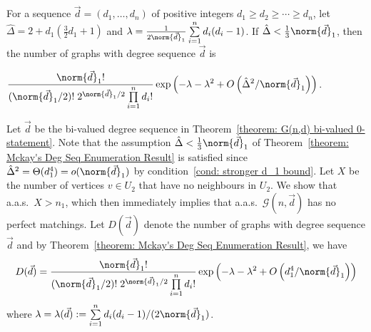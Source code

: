 \documentclass[12pt]{article}
\begin{document}
\begin{theorem}
\label{theorem: Mckay's Deg Seq Enumeration Result}
For a sequence $\vec{d} = (d_1,\ldots,d_n)$ of positive integers $d_1\geq d_2\geq\cdots\geq d_n$, let $\hat{\Delta} = 2 + d_1(\frac{3}{2} d_1 +1)$ and $\lambda = \frac{1}{2\norm{\vec{d}}_1}\sum\limits_{i = 1}^{n} d_i(d_i-1)$.  If $\hat{\Delta} < \frac{1}{3}\norm{\vec{d}}_1$, then the number of graphs with degree sequence $\vec{d}$ is
\begin{center}
    $\displaystyle\frac{\norm{\vec{d}}_1!}{(\norm{\vec{d}}_1/2)!\hspace{1mm} 2^{\norm{\vec{d}}_1/2}\prod\limits_{i=1}^{n} d_i!}\exp\left(-\lambda - \lambda^2 + O\left(\hat{\Delta}^2/\norm{\vec{d}}_1\right)\right)$.
\end{center}
\end{theorem}

Let $\vec{d}$ be the bi-valued degree sequence in Theorem~\ref{theorem: G(n,d) bi-valued 0-statement}.
Note that the assumption  $\hat{\Delta} < \frac{1}{3}\norm{\vec{d}}_1$ of Theorem~\ref{theorem: Mckay's Deg Seq Enumeration Result} is satisfied since $\hat{\Delta}^2 = \Theta(d_1^4) = o(\norm{\vec{d}}_1)$ by condition~\ref{cond: stronger d_1 bound}. Let $X$ be the number of vertices $v\in U_2$ that have no neighbours in $U_2$. We show that a.a.s.\ $X > n_1$, which then immediately implies that a.a.s.\ $\mathcal{G}(n,\vec{d})$ has no perfect matchings. Let $D(\vec{d})$ denote the number of graphs with degree sequence $\vec{d}$ and by Theorem~\ref{theorem: Mckay's Deg Seq Enumeration Result}, we have
\[
D(\vec{d}) = \displaystyle\frac{\norm{\vec{d}}_1!}{(\norm{\vec{d}}_1/2)!\hspace{1mm} 2^{\norm{\vec{d}}_1/2} \prod\limits_{i = 1}^{n} d_i!} \exp\left(-\lambda - \lambda^2 + O\left(d_1^4/\norm{\vec{d}}_1\right)\right)
\]
where $\lambda  =\lambda(\vec{d}):= \sum\limits_{i = 1}^{n} d_i (d_i-1)/(2\norm{\vec{d}}_1)$.
\end{document}
